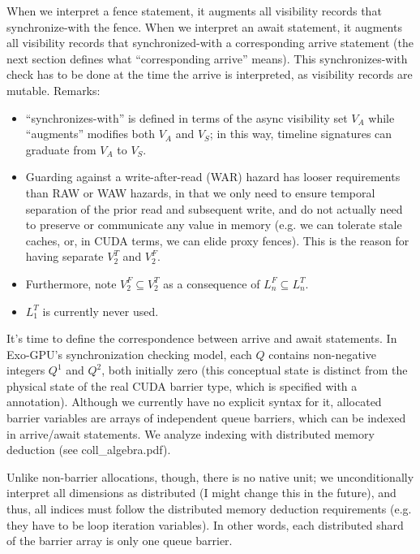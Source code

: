 \filbreak
When we interpret a fence statement, it augments all visibility records that synchronize-with the fence.
When we interpret an await statement, it augments all visibility records that synchronized-with a corresponding arrive statement
(the next section defines what ``corresponding arrive'' means).
This synchronizes-with check has to be done at the time the arrive is interpreted, as visibility records are mutable.
Remarks:
\filbreak
\begin{itemize}
  \item ``synchronizes-with'' is defined in terms of the async visibility set $V_A$ while ``augments'' modifies both $V_A$ and $V_S$; in this way, timeline signatures can graduate from $V_A$ to $V_S$.
  \filbreak
  \item Guarding against a write-after-read (WAR) hazard has looser requirements than RAW or WAW hazards, in that we only need to ensure temporal separation of the prior read and subsequent write, and do not actually need to preserve or communicate any value in memory (e.g. we can tolerate stale caches, or, in CUDA terms, we can elide proxy fences).
  This is the reason for having separate $V_2^T$ and $V_2^F$.
  \filbreak
  \item Furthermore, note $V_2^F \subseteq V_2^T$ as a consequence of $L_n^F \subseteq L_n^T$.
  \filbreak
  \item $L_1^T$ is currently never used.
\end{itemize}

\newpage
{}
\label{ch:ArriveAwaitPairing}

It's time to define the correspondence between arrive and await statements.
In Exo-GPU's synchronization checking model, each  $Q$ contains non-negative integers  $Q^1$ and  $Q^2$, both initially zero (this conceptual state is distinct from the physical state of the real CUDA barrier type, which is specified with a  annotation).
Although we currently have no explicit syntax for it, allocated barrier variables are arrays of independent queue barriers, which can be indexed in arrive/await statements.
We analyze indexing with distributed memory deduction (see coll\_algebra.pdf).



\filbreak
Unlike non-barrier allocations, though, there is no native unit; we unconditionally interpret all dimensions as distributed (I might change this in the future), and thus, all indices must follow the distributed memory deduction requirements (e.g. they have to be  loop iteration variables).
In other words, each distributed shard of the barrier array is only one queue barrier.

